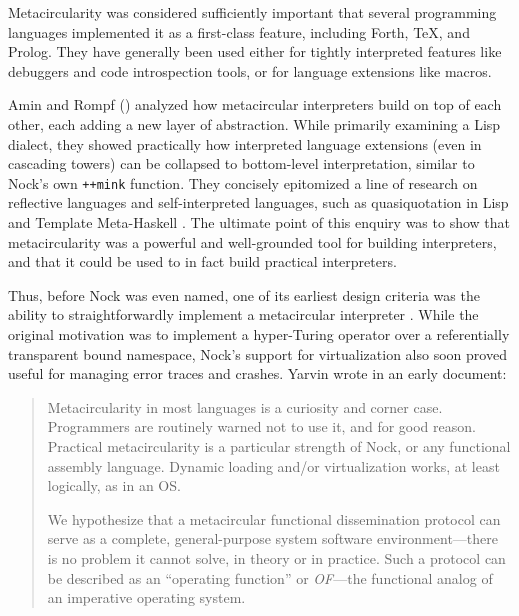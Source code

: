\documentclass[twoside]{article}
\begin{document}
Metacircularity was considered sufficiently important that several programming languages implemented it as a first-class feature, including Forth, TeX, and Prolog.  They have generally been used either for tightly interpreted features like debuggers and code introspection tools, or for language extensions like macros.

Amin and Rompf (\citeyear{Amin2017}) analyzed how metacircular interpreters build on top of each other, each adding a new layer of abstraction.  While primarily examining a Lisp dialect, they showed practically how interpreted language extensions (even in cascading towers) can be collapsed to bottom-level interpretation, similar to Nock's own \lstinline[style=inlinecode]{++mink} function.  They concisely epitomized a line of research on reflective languages and self-interpreted languages, such as quasiquotation in Lisp \citep{Bawden1999} and Template Meta-Haskell \citep{Sheard2002}.  The ultimate point of this enquiry was to show that metacircularity was a powerful and well-grounded tool for building interpreters, and that it could be used to in fact build practical interpreters.

Thus, before Nock was even named, one of its earliest design criteria was the ability to straightforwardly implement a metacircular interpreter \citep{Yarvin2006,Yarvin2010}.  While the original motivation was to implement a hyper-Turing operator over a referentially transparent bound namespace, Nock's support for virtualization also soon proved useful for managing error traces and crashes.
Yarvin wrote in an early document:

\begin{quote}
Metacircularity in most languages is a curiosity and corner case.  Programmers are routinely warned not to use it, and for good reason.  Practical metacircularity is a particular strength of Nock, or any functional assembly language.  Dynamic loading and/or virtualization works, at least logically, as in an OS.

We hypothesize that a metacircular functional dissemination protocol can serve as a complete, general-purpose system software environment—there is no problem it cannot solve, in theory or in practice.  Such a protocol can be described as an ``operating function'' or \emph{OF}—the functional analog of an imperative operating system.  \citep{Yarvin2010a}
\end{quote}
\end{document}
